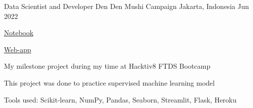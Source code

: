 \begin{cventries}
  \cventry
    {Data Scientist and Developer} %
    {Den Den Mushi Campaign} %
    {Jakarta, Indonesia} %
    {Jun 2022} %
    {
      \begin{cvitems} %
        \item {\href{https://github.com/NikkiSatmaka/dendenmushi-campaign/blob/main/h8dsft_Milestone2P1_nikki_satmaka.ipynb}{Notebook}}
        \item {\href{https://dendenmushi-campaign.herokuapp.com/}{Web-app}}
        \item {My milestone project during my time at Hacktiv8 FTDS Bootcamp}
        \item {This project was done to practice supervised machine learning model}
        \item {Tools used: Scikit-learn, NumPy, Pandas, Seaborn, Streamlit, Flask, Heroku}
      \end{cvitems}
    }



\end{cventries}
